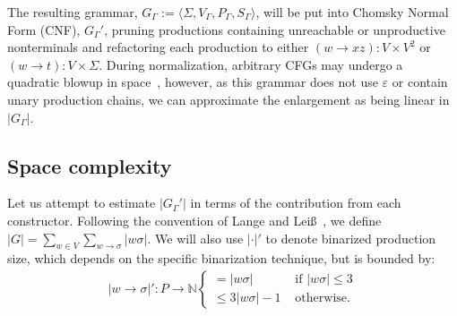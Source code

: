 \documentclass[sigplan,nonacm]{acmart}\settopmatter{printfolios=false,printccs=false,printacmref=false}
\begin{document}
  \vspace{0.2cm}

  The resulting grammar, $G_\Gamma:=\langle \Sigma, V_\Gamma, P_\Gamma, S_\Gamma\rangle$, will be put into Chomsky Normal Form (CNF), $G_\Gamma'$, pruning productions containing unreachable or unproductive nonterminals and refactoring each production to either $(w \rightarrow x z): V\times V^2$ or $(w \rightarrow t): V\times\Sigma$. During normalization, arbitrary CFGs may undergo a quadratic blowup in space~\cite{lange2009cnf}, however, as this grammar does not use $\varepsilon$ or contain unary production chains, we can approximate the enlargement as being linear in $|G_\Gamma|$.

  \subsection{Space complexity}

  Let us attempt to estimate $|G_\Gamma'|$ in terms of the contribution from each constructor. Following the convention of Lange and Lei{\ss}~\cite{lange2009cnf}, we define $|G| = \sum_{w\in V}\sum_{w\rightarrow \sigma} |w\sigma|$. We will also use $|\cdot|'$ to denote binarized production size, which depends on the specific binarization technique, but is bounded by:
    \begin{align*}
      |w\rightarrow \sigma|': P \rightarrow \mathbb{N}
      \begin{cases}
         = |w\sigma| &\text{ if } |w\sigma| \leq 3\\
         \leq 3|w \sigma| - 1 &\text{ otherwise.}
      \end{cases}
    \end{align*}
\end{document}
